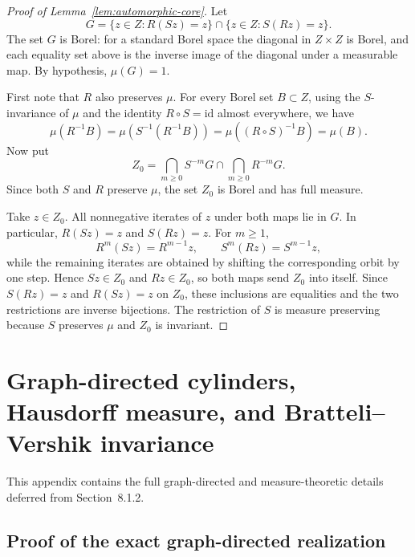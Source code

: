 \documentclass[11pt]{amsart}
\theoremstyle{plain}
\theoremstyle{definition}
\theoremstyle{remark}
\begin{document}
\begin{proof}[Proof of Lemma~\ref{lem:automorphic-core}]
Let
\[
        G=\{z\in Z:R(Sz)=z\}\cap\{z\in Z:S(Rz)=z\}.
\]
The set \(G\) is Borel: for a standard Borel space the diagonal in \(Z\times Z\) is
Borel, and each equality set above is the inverse image of the diagonal under a measurable
map. By hypothesis, \(\mu(G)=1\).

First note that \(R\) also preserves \(\mu\). For every Borel set \(B\subset Z\),
using the \(S\)-invariance of \(\mu\) and the identity \(R\circ S=\mathrm{id}\) almost
everywhere, we have
\[
        \mu(R^{-1}B)
        =\mu(S^{-1}(R^{-1}B))
        =\mu((R\circ S)^{-1}B)
        =\mu(B).
\]
Now put
\[
        Z_0=\bigcap_{m\geq0}S^{-m}G\cap\bigcap_{m\geq0}R^{-m}G.
\]
Since both \(S\) and \(R\) preserve \(\mu\), the set \(Z_0\) is Borel and has full
measure.

Take \(z\in Z_0\). All nonnegative iterates of \(z\) under both maps lie in \(G\). In
particular, \(R(Sz)=z\) and \(S(Rz)=z\). For \(m\geq1\),
\[
        R^m(Sz)=R^{m-1}z,
        \qquad
        S^m(Rz)=S^{m-1}z,
\]
while the remaining iterates are obtained by shifting the corresponding orbit by one step.
Hence \(Sz\in Z_0\) and \(Rz\in Z_0\), so both maps send \(Z_0\) into itself. Since
\(S(Rz)=z\) and \(R(Sz)=z\) on \(Z_0\), these inclusions are equalities and the two
restrictions are inverse bijections. The restriction of \(S\) is measure preserving because
\(S\) preserves \(\mu\) and \(Z_0\) is invariant.
\end{proof}

\section{Graph-directed cylinders, Hausdorff measure, and Bratteli--Vershik invariance}
\label{app:graph-directed-details}

This appendix contains the full graph-directed and measure-theoretic details
deferred from Section~8.1.2.

\subsection{Proof of the exact graph-directed realization}
\end{document}
